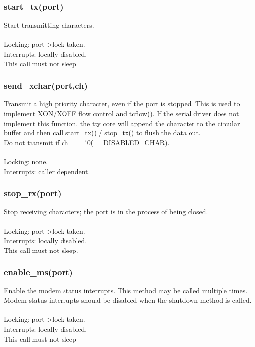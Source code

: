 \documentclass[12pt,a4paper]{article}
\begin{document}
\subsubsection{start\_tx(port)}
	Start transmitting characters.\\ \\
	Locking: port-\textgreater lock taken.\\
	Interrupts: locally disabled.\\
	This call must not sleep\\
\subsubsection{send\_xchar(port,ch)}
	Transmit a high priority character, even if the port is stopped.
	This is used to implement XON/XOFF flow control and tcflow().  If
	the serial driver does not implement this function, the tty core
	will append the character to the circular buffer and then call
	start\_tx() / stop\_tx() to flush the data out.\\
	Do not transmit if ch == \'\ 0\' (\_\_DISABLED\_CHAR).\\ \\
	Locking: none.\\
	Interrupts: caller dependent.\\

\subsubsection{stop\_rx(port)}
	Stop receiving characters; the port is in the process of
	being closed.\\ \\
	Locking: port-\textgreater lock taken.\\
	Interrupts: locally disabled.\\
	This call must not sleep.\\
\subsubsection{enable\_ms(port)}
	Enable the modem status interrupts.
	This method may be called multiple times. Modem status
	interrupts should be disabled when the shutdown method is
	called.\\ \\
	Locking: port-\textgreater lock taken.\\
	Interrupts: locally disabled.\\
	This call must not sleep\\
\end{document}
